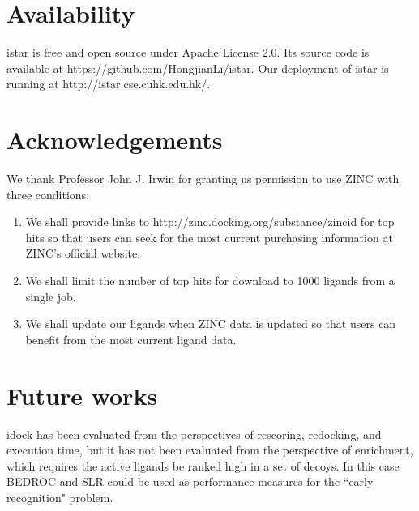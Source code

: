 \section{Availability}

istar is free and open source under Apache License 2.0. Its source code is available at https://github.com/HongjianLi/istar. Our deployment of istar is running at http://istar.cse.cuhk.edu.hk/.

\section{Acknowledgements}

We thank Professor John J. Irwin for granting us permission to use ZINC \citep{532,1178} with three conditions:
\begin{enumerate}
\item We shall provide links to http://zinc.docking.org/substance/zincid for top hits so that users can seek for the most current purchasing information at ZINC's official website.
\item We shall limit the number of top hits for download to 1000 ligands from a single job.
\item We shall update our ligands when ZINC data is updated so that users can benefit from the most current ligand data.
\end{enumerate}

\section{Future works}

idock has been evaluated from the perspectives of rescoring, redocking, and execution time, but it has not been evaluated from the perspective of enrichment, which requires the active ligands be ranked high in a set of decoys. In this case BEDROC \citep{490} and SLR \citep{489} could be used as performance measures for the ``early recognition" problem.

\chapterend
